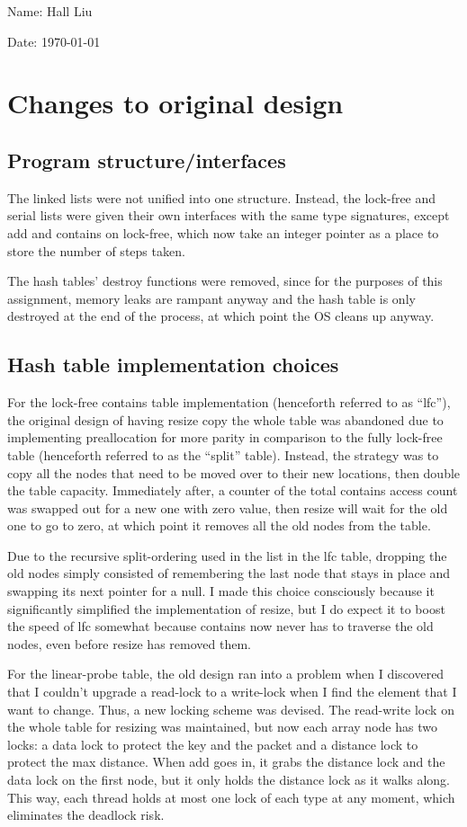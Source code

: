 \documentclass{article}
\begin{document}
Name: Hall Liu

Date: \today 
\vspace{20pt}

\section*{Changes to original design}
\subsection*{Program structure/interfaces}
The linked lists were not unified into one structure. Instead, the lock-free and serial lists were given their own interfaces with the same type signatures, except add and contains on lock-free, which now take an integer pointer as a place to store the number of steps taken.

The hash tables' destroy functions were removed, since for the purposes of this assignment, memory leaks are rampant anyway and the hash table is only destroyed at the end of the process, at which point the OS cleans up anyway.
\subsection*{Hash table implementation choices}
For the lock-free contains table implementation (henceforth referred to as ``lfc''), the original design of having resize copy the whole table was abandoned due to implementing preallocation for more parity in comparison to the fully lock-free table (henceforth referred to as the ``split'' table). Instead, the strategy was to copy all the nodes that need to be moved over to their new locations, then double the table capacity. Immediately after, a counter of the total contains access count was swapped out for a new one with zero value, then resize will wait for the old one to go to zero, at which point it removes all the old nodes from the table.

Due to the recursive split-ordering used in the list in the lfc table, dropping the old nodes simply consisted of remembering the last node that stays in place and swapping its next pointer for a null. I made this choice consciously because it significantly simplified the implementation of resize, but I do expect it to boost the speed of lfc somewhat because contains now never has to traverse the old nodes, even before resize has removed them.

For the linear-probe table, the old design ran into a problem when I discovered that I couldn't upgrade a read-lock to a write-lock when I find the element that I want to change. Thus, a new locking scheme was devised. The read-write lock on the whole table for resizing was maintained, but now each array node has two locks: a data lock to protect the key and the packet and a distance lock to protect the max distance. When add goes in, it grabs the distance lock and the data lock on the first node, but it only holds the distance lock as it walks along. This way, each thread holds at most one lock of each type at any moment, which eliminates the deadlock risk.
\end{document}
